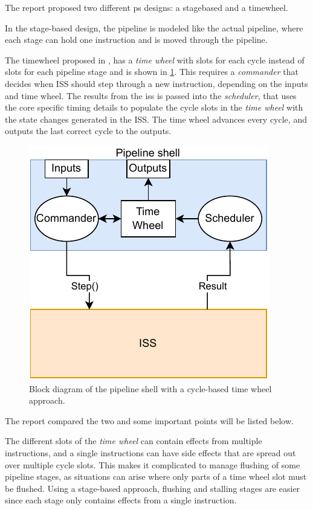 The report proposed two different \gls{ps} designs: a \Gls{stagebased} and a \Gls{timewheel}. 

In the stage-based design, the pipeline is modeled like the actual pipeline, where each stage can hold one instruction and is moved through the pipeline.

The \Gls{timewheel} proposed in \cite{chiangEfficientTwolayeredCycleaccurate2009}, has a \textit{time wheel} with slots for each cycle instead of slots for each pipeline stage and is shown in \cref{fig:time wheel block}. This requires a \textit{commander} that decides when ISS should step through a new instruction, depending on the inputs and time wheel. The results from the \acrshort{iss} is passed into the \textit{scheduler}, that uses the core specific timing details to populate the cycle slots in the \textit{time wheel} with the state changes generated in the ISS. The time wheel advances every cycle, and outputs the last correct cycle to the outputs.

\begin{figure}[htb]
    \centering
    \includegraphics[width=0.5\linewidth]{prosjektoppgave/time-wheel.pdf}
    \caption{Block diagram of the pipeline shell with a cycle-based time wheel approach.}
    \label{fig:time wheel block}
\end{figure}

The report compared the two and some important points will be listed below.

The different slots of the \textit{time wheel} can contain effects from multiple instructions, and a single instructions can have side effects that are spread out over multiple cycle slots. This makes it complicated to manage flushing of some pipeline stages, as situations can arise where only parts of a time wheel slot must be flushed. Using a stage-based approach, flushing and stalling stages are easier since each stage only contains effects from a single instruction.


